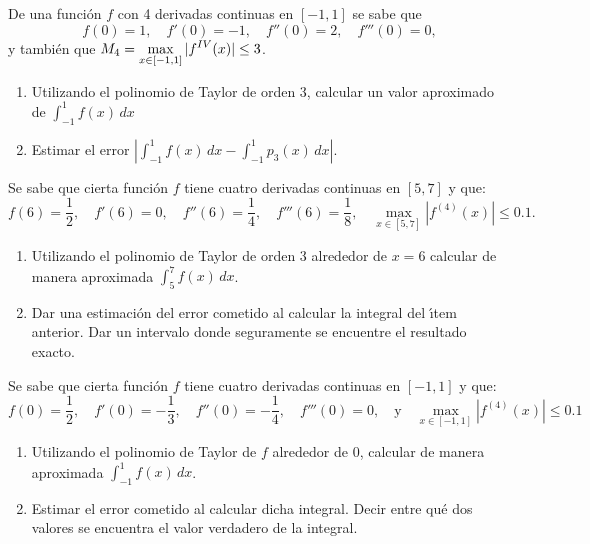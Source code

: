 
\item De una funci\'on $f$ con 4 derivadas continuas en $[-1,1]$ se sabe que
\[
f(0)=1,\quad f'(0)=-1,\quad f''(0)=2, \quad f'''(0)=0,
\]
y tambi\'en que $\displaystyle M_4=\max_{x\in[-1,1]}|f^{IV}(x)|\le 3$.

\begin{enumerate}
\item Utilizando el polinomio de Taylor de orden 3, calcular un valor aproximado de $\int_{-1}^1f(x)\,dx$
\item Estimar el error $|\int_{-1}^1 f(x)\, dx - \int_{-1}^1 p_3(x)\, dx|$.
\end{enumerate}

\item Se sabe que cierta funci\'on $f$ tiene cuatro derivadas continuas en
$[5,7]$ y que:
\[
f(6) = \frac12, \quad f'(6) = 0, \quad f''(6) = \frac14,
\quad f'''(6) = \frac18,\quad \max_{x\in[5,7]} |f^{(4)}(x)| \le 0.1.
\]
\begin{enumerate}
\item Utilizando el polinomio de Taylor de orden 3 alrededor de $x=6$
  calcular de manera aproximada $\int_5^7 f(x) \, dx$.
\item  Dar una estimaci\'on del error cometido al calcular la integral
    del \'\i tem anterior. Dar un intervalo donde seguramente se
    encuentre el resultado exacto.
\end{enumerate}

\item
Se sabe que cierta funci\'on $f$ tiene cuatro derivadas continuas en
$[-1,1]$ y que:
\[
f(0) = \frac12, \quad f'(0) = -\frac13, \quad f''(0) = -\frac14,
\quad f'''(0) = 0, \quad\text{y}\quad
\max_{x\in[-1,1]} |f^{(4)}(x)| \le 0.1
\]
\begin{enumerate}
\item Utilizando el polinomio de Taylor de $f$ alrededor de $0$, calcular de manera aproximada $\int_{-1}^1 f(x) \, dx$.

\item Estimar el error cometido al calcular dicha integral. Decir entre qu\'e dos valores se encuentra el valor verdadero de la integral.
\end{enumerate}
